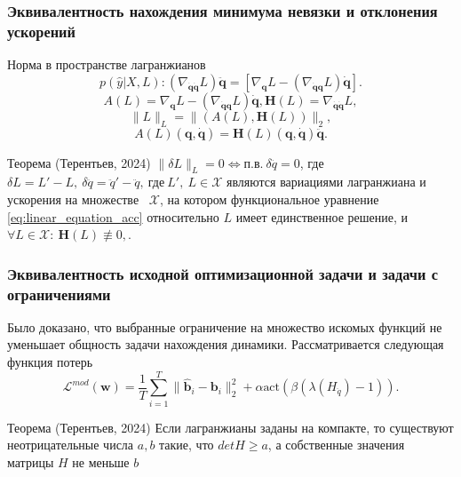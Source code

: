 \documentclass{beamer}
\begin{document}
\begin{frame}
\frametitle{Эквивалентность нахождения минимума невязки и отклонения ускорений}
\begin{block} {Норма в пространстве лагранжианов}
\[
p(\hat{y}| X, L): \left(\nabla_{\dot{\mathbf{q}} \dot{\mathbf{q}}} L\right)\ddot{\mathbf{q}} = \left[\nabla_{\mathbf{q}} L-\left(\nabla_{\dot{\mathbf{q}}\mathbf{q}} L\right) \dot{\mathbf{q}}\right].
\]
$$A(L) = \nabla_{\mathbf{q}} L-\left(\nabla_{\dot{\mathbf{q}}\mathbf{q}} L\right) \dot{\mathbf{q}}, \mathbf{H}(L) = \nabla_{\dot{\mathbf{q}} \dot{\mathbf{q}}} L,$$
$$\|L\|_L = \|(A(L), \mathbf{H}(L))\|_2,$$
\begin{equation}\label{eq:linear_equation_acc}
A(L)(\mathbf{q}, \dot{\mathbf{q}}) = \mathbf{H}(L)(\mathbf{q}, \dot{\mathbf{q}})\ddot{\mathbf{q}}.
\end{equation}
\end{block}

\begin{block} {Теорема (Терентьев, 2024)}
$\|\delta L\|_L = 0 \Leftrightarrow \text{п.в.}~\delta \ddot{q} = 0$, где $\delta L = L' - L, ~\delta \ddot{q} = \ddot{q}' - \ddot{q}, ~\text{где} \ L',\ L \in \mathcal {X}$ являются вариациями лагранжиана и ускорения на множестве ~$\mathcal {X}$, на котором функциональное уравнение \ref{eq:linear_equation_acc} относительно $L$ имеет единственное решение, и $\forall L\in \mathcal{X}:~\mathbf{H}(L) \not\equiv 0, $.
\end{block}

\end{frame}



\begin{frame}
\frametitle{Эквивалентность исходной оптимизационной задачи и задачи с ограничениями}

Было доказано, что выбранные ограничение на множество искомых функций не уменьшает общность задачи нахождения динамики. Рассматривается следующая функция потерь
$$
 \mathcal{L}^{mod}(\textbf{w}) = \frac{1}{T}\sum_{i=1}^{T} \| \mathbf{\hat{b}}_i - \mathbf{b}_i \|_2^2  + \alpha \text{act}(\beta (\lambda(H_{\ddot{q}}) - 1)).
$$

\begin{block} {Теорема (Терентьев, 2024)}
Если лагранжианы заданы на компакте, то существуют неотрицательные числа $a, b$ такие, что $det H \ge a$, а собственные значения матрицы $H$ не меньше $b$
\end{block} 
\end{frame}
\end{document}
